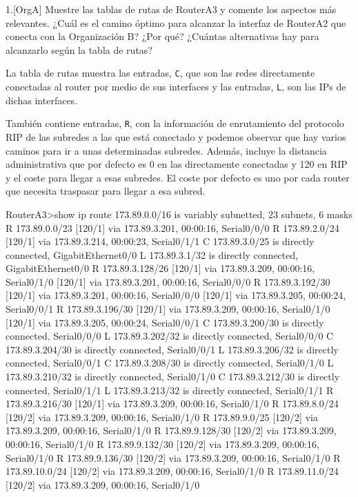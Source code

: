\begin{ejer}
1.[OrgA] Muestre las tablas de rutas de RouterA3 y comente los aspectos más relevantes. ¿Cuál es el camino óptimo para alcanzar la interfaz de RouterA2 que conecta con la Organización B? ¿Por qué? ¿Cuántas alternativas hay para alcanzarlo según la tabla de rutas?
\end{ejer}

\par La tabla de rutas muestra las entradas, \texttt{C}, que son las redes directamente conectadas al router por medio de sus interfaces y las entradas, \texttt{L}, son las IPs de dichas interfaces.
\par También contiene entradas, \texttt{R}, con la información de enrutamiento del protocolo RIP de las subredes a las que está conectado y podemos observar que hay varios caminos para ir a unas determinadas subredes. Además, incluye la distancia administrativa que por defecto es 0 en las directamente conectadas y 120 en RIP y el coste para llegar a esas subredes. El coste por defecto es uno por cada router que necesita traspasar para llegar a esa subred.

\begin{listing}[style=consola]
RouterA3>show ip route 
     173.89.0.0/16 is variably subnetted, 23 subnets, 6 masks
R       173.89.0.0/23 [120/1] via 173.89.3.201, 00:00:16, Serial0/0/0
R       173.89.2.0/24 [120/1] via 173.89.3.214, 00:00:23, Serial0/1/1
C       173.89.3.0/25 is directly connected, GigabitEthernet0/0
L       173.89.3.1/32 is directly connected, GigabitEthernet0/0
R       173.89.3.128/26 [120/1] via 173.89.3.209, 00:00:16, Serial0/1/0
                        [120/1] via 173.89.3.201, 00:00:16, Serial0/0/0
R       173.89.3.192/30 [120/1] via 173.89.3.201, 00:00:16, Serial0/0/0
                        [120/1] via 173.89.3.205, 00:00:24, Serial0/0/1
R       173.89.3.196/30 [120/1] via 173.89.3.209, 00:00:16, Serial0/1/0
                        [120/1] via 173.89.3.205, 00:00:24, Serial0/0/1
C       173.89.3.200/30 is directly connected, Serial0/0/0
L       173.89.3.202/32 is directly connected, Serial0/0/0
C       173.89.3.204/30 is directly connected, Serial0/0/1
L       173.89.3.206/32 is directly connected, Serial0/0/1
C       173.89.3.208/30 is directly connected, Serial0/1/0
L       173.89.3.210/32 is directly connected, Serial0/1/0
C       173.89.3.212/30 is directly connected, Serial0/1/1
L       173.89.3.213/32 is directly connected, Serial0/1/1
R       173.89.3.216/30 [120/1] via 173.89.3.209, 00:00:16, Serial0/1/0
R       173.89.8.0/24 [120/2] via 173.89.3.209, 00:00:16, Serial0/1/0
R       173.89.9.0/25 [120/2] via 173.89.3.209, 00:00:16, Serial0/1/0
R       173.89.9.128/30 [120/2] via 173.89.3.209, 00:00:16, Serial0/1/0
R       173.89.9.132/30 [120/2] via 173.89.3.209, 00:00:16, Serial0/1/0
R       173.89.9.136/30 [120/2] via 173.89.3.209, 00:00:16, Serial0/1/0
R       173.89.10.0/24 [120/2] via 173.89.3.209, 00:00:16, Serial0/1/0
R       173.89.11.0/24 [120/2] via 173.89.3.209, 00:00:16, Serial0/1/0
\end{listing}

